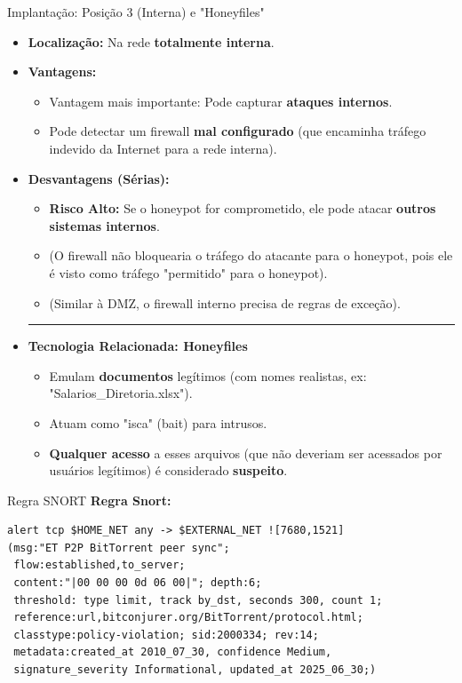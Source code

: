 \begin{frame}{Implantação: Posição 3 (Interna) e "Honeyfiles"}
    \begin{itemize}
        \item \textbf{Localização:} Na rede \textbf{totalmente interna}.

        \item \textbf{Vantagens:}
              \begin{itemize}
                  \item Vantagem mais importante: Pode capturar \textbf{ataques internos}.
                  \item Pode detectar um firewall \textbf{mal configurado} (que encaminha tráfego indevido da Internet para a rede interna).
              \end{itemize}

        \item \textbf{Desvantagens (Sérias):}
              \begin{itemize}
                  \item \textbf{Risco Alto:} Se o honeypot for comprometido, ele pode atacar \textbf{outros sistemas internos}.
                  \item (O firewall não bloquearia o tráfego do atacante para o honeypot, pois ele é visto como tráfego "permitido" para o honeypot).
                  \item (Similar à DMZ, o firewall interno precisa de regras de exceção).
              \end{itemize}
              \hrule
        \item \textbf{Tecnologia Relacionada: Honeyfiles}
              \begin{itemize}
                  \item Emulam \textbf{documentos} legítimos (com nomes realistas, ex: "Salarios\_Diretoria.xlsx").
                  \item Atuam como "isca" (bait) para intrusos.
                  \item \textbf{Qualquer acesso} a esses arquivos (que não deveriam ser acessados por usuários legítimos) é considerado \textbf{suspeito}.
              \end{itemize}
    \end{itemize}
\end{frame}



\begin{frame}[fragile]{Regra SNORT}
    \small
    \textbf{Regra Snort:}
    \begin{verbatim}
alert tcp $HOME_NET any -> $EXTERNAL_NET ![7680,1521] 
(msg:"ET P2P BitTorrent peer sync"; 
 flow:established,to_server; 
 content:"|00 00 00 0d 06 00|"; depth:6; 
 threshold: type limit, track by_dst, seconds 300, count 1; 
 reference:url,bitconjurer.org/BitTorrent/protocol.html; 
 classtype:policy-violation; sid:2000334; rev:14; 
 metadata:created_at 2010_07_30, confidence Medium, 
 signature_severity Informational, updated_at 2025_06_30;)
\end{verbatim}
\end{frame}



